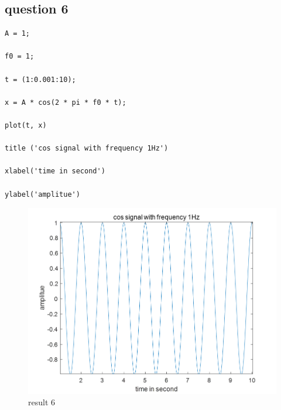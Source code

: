 \documentclass{article}
\begin{document}
\subsection{question 6}
\begin{lstlisting}
A = 1;

f0 = 1;

t = (1:0.001:10);

x = A * cos(2 * pi * f0 * t);

plot(t, x)

title ('cos signal with frequency 1Hz')

xlabel('time in second')

ylabel('amplitue')

\end{lstlisting}
\begin{figure}[H]
    \centering
    \includegraphics[width=1\linewidth]{6.png}
    \caption{result 6}
    \label{fig:6}
\end{figure}
\end{document}
